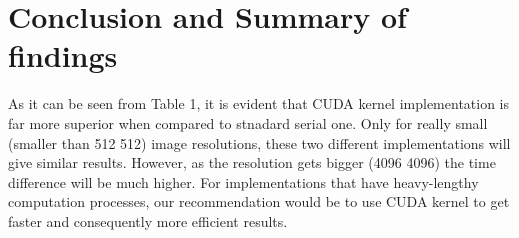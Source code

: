 \documentclass{article}
\begin{document}
\section{Conclusion and Summary of findings}
As it can be seen from Table 1, it is evident that CUDA kernel implementation is far more superior when compared to stnadard serial one. Only for really small (smaller than 512 512) image resolutions, these two different implementations will give similar results. However, as the resolution gets bigger (4096 4096) the time difference will be much higher. For implementations that have heavy-lengthy computation processes, our recommendation would be to use CUDA kernel to get faster and consequently more efficient results.
\end{document}
